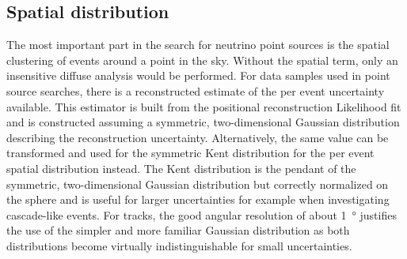 \subsection{Spatial distribution}
The most important part in the search for neutrino point sources is the spatial clustering of events around a point in the sky.
Without the spatial term, only an insensitive diffuse analysis would be performed.
For data samples used in point source searches, there is a reconstructed estimate of the per event uncertainty available.
This estimator is built from the positional reconstruction Likelihood fit and is constructed assuming a symmetric, two-dimensional Gaussian distribution describing the reconstruction uncertainty.
Alternatively, the same value can be transformed and used for the symmetric Kent distribution  for the per event spatial distribution instead.
The Kent distribution is the pendant of the symmetric, two-dimensional Gaussian distribution but correctly normalized on the sphere and is useful for larger uncertainties for example when investigating cascade-like events.
For tracks, the good angular resolution of about \SI{1}{\degree} justifies the use of the simpler and more familiar Gaussian distribution as both distributions become virtually indistinguishable for small uncertainties.

